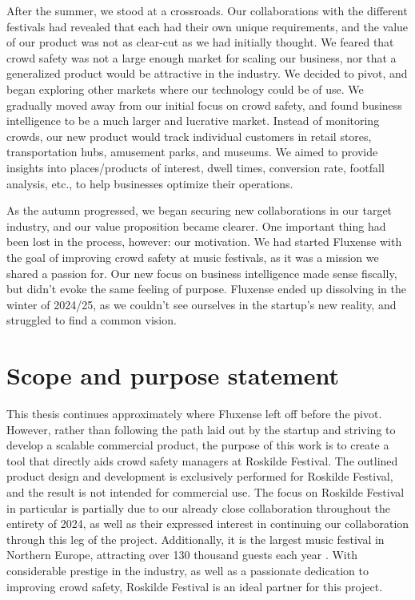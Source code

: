After the summer, we stood at a crossroads. Our collaborations with the different festivals had revealed that each had their own unique requirements, and the value of our product was not as clear-cut as we had initially thought. We feared that crowd safety was not a large enough market for scaling our business, nor that a generalized product would be attractive in the industry. We decided to pivot, and began exploring other markets where our technology could be of use. We gradually moved away from our initial focus on crowd safety, and found business intelligence to be a much larger and lucrative market. Instead of monitoring crowds, our new product would track individual customers in retail stores, transportation hubs, amusement parks, and museums. We aimed to provide insights into places/products of interest, dwell times, conversion rate, footfall analysis, etc., to help businesses optimize their operations.

As the autumn progressed, we began securing new collaborations in our target industry, and our value proposition became clearer. One important thing had been lost in the process, however: our motivation. We had started Fluxense with the goal of improving crowd safety at music festivals, as it was a mission we shared a passion for. Our new focus on business intelligence made sense fiscally, but didn't evoke the same feeling of purpose. Fluxense ended up dissolving in the winter of 2024/25, as we couldn't see ourselves in the startup's new reality, and struggled to find a common vision.

\section{Scope and purpose statement}
\label{sec:mission-statement}

This thesis continues approximately where Fluxense left off before the pivot. However, rather than following the path laid out by the startup and striving to develop a scalable commercial product, the purpose of this work is to create a tool that directly aids crowd safety managers at Roskilde Festival. The outlined product design and development is exclusively performed for Roskilde Festival, and the result is not intended for commercial use. The focus on Roskilde Festival in particular is partially due to our already close collaboration throughout the entirety of 2024, as well as their expressed interest in continuing our collaboration through this leg of the project. Additionally, it is the largest music festival in Northern Europe, attracting over 130 thousand guests each year \cite{rf}. With considerable prestige in the industry, as well as a passionate dedication to improving crowd safety, Roskilde Festival is an ideal partner for this project.


